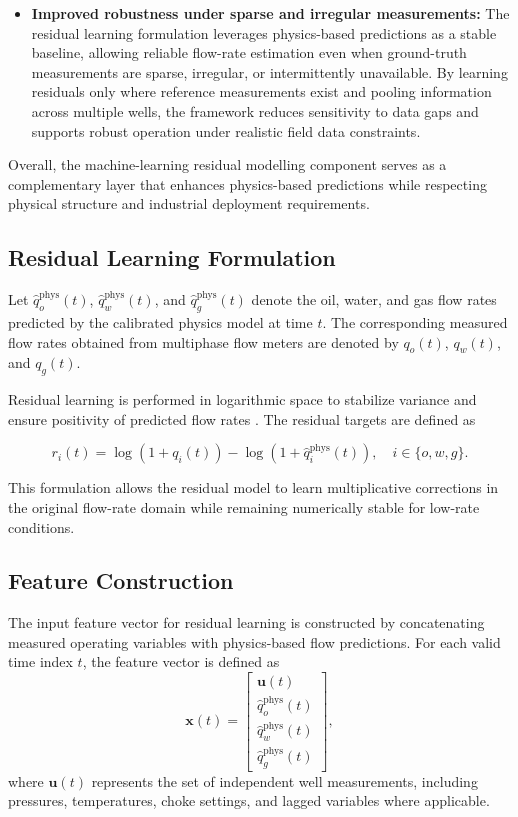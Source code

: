 \documentclass[12pt,APA]{uomthesis}
\begin{document}
\begin{itemize}
    \item \textbf{Improved robustness under sparse and irregular measurements:}  
        The residual learning formulation leverages physics-based predictions as a stable
        baseline, allowing reliable flow-rate estimation even when ground-truth measurements
        are sparse, irregular, or intermittently unavailable. By learning residuals only
        where reference measurements exist and pooling information across multiple wells,
        the framework reduces sensitivity to data gaps and supports robust operation under
        realistic field data constraints.
\end{itemize}

Overall, the machine-learning residual modelling component serves as a complementary layer that enhances physics-based predictions while respecting physical structure and industrial deployment requirements.

\subsection{Residual Learning Formulation}
Let $\hat{q}_o^{\text{phys}}(t)$, $\hat{q}_w^{\text{phys}}(t)$, and $\hat{q}_g^{\text{phys}}(t)$ denote the oil, water, and gas flow rates predicted by the calibrated physics model at time $t$. The corresponding measured flow rates obtained from multiphase flow meters are denoted by $q_o(t)$, $q_w(t)$, and $q_g(t)$.

Residual learning is performed in logarithmic space to stabilize variance and ensure positivity of predicted flow rates \citep{box1964analysis}. The residual targets are defined as

\begin{equation}
r_i(t) = \log\!\left(1 + q_i(t)\right) - \log\!\left(1 + \hat{q}_i^{\text{phys}}(t)\right),
\quad i \in \{o, w, g\}.
\end{equation}

This formulation allows the residual model to learn multiplicative corrections in the original flow-rate domain while remaining numerically stable for low-rate conditions.

\subsection{Feature Construction}
The input feature vector for residual learning is constructed by concatenating measured operating variables with physics-based flow predictions. For each valid time index $t$, the feature vector is defined as
\begin{equation}
\mathbf{x}(t) =
\begin{bmatrix}
\mathbf{u}(t) \\
\hat{q}_o^{\text{phys}}(t) \\
\hat{q}_w^{\text{phys}}(t) \\
\hat{q}_g^{\text{phys}}(t)
\end{bmatrix},
\end{equation}
where $\mathbf{u}(t)$ represents the set of independent well measurements, including pressures, temperatures, choke settings, and lagged variables where applicable.
\end{document}

